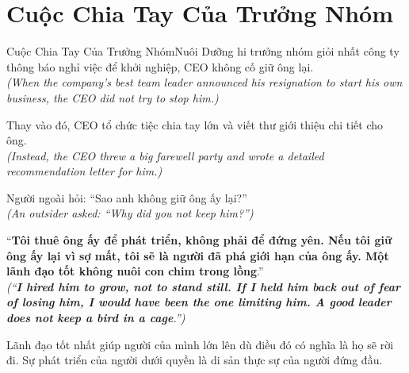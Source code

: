 \section{Cuộc Chia Tay Của Trưởng Nhóm}
\begin{truyen}{Cuộc Chia Tay Của Trưởng Nhóm}{Nuôi Dưỡng}
hi trưởng nhóm giỏi nhất công ty thông báo nghỉ việc để khởi nghiệp, CEO không cố giữ ông lại.\\
\textit{(When the company's best team leader announced his resignation to start his own business, the CEO did not try to stop him.)}

Thay vào đó, CEO tổ chức tiệc chia tay lớn và viết thư giới thiệu chi tiết cho ông.\\
\textit{(Instead, the CEO threw a big farewell party and wrote a detailed recommendation letter for him.)}

Người ngoài hỏi: ``Sao anh không giữ ông ấy lại?''\\
\textit{(An outsider asked: ``Why did you not keep him?'')}

``\textbf{Tôi thuê ông ấy để phát triển, không phải để đứng yên. Nếu tôi giữ ông ấy lại vì sợ mất, tôi sẽ là người đã phá giới hạn của ông ấy. Một lãnh đạo tốt không nuôi con chim trong lồng}.''\\
\textit{(``\textbf{I hired him to grow, not to stand still. If I held him back out of fear of losing him, I would have been the one limiting him. A good leader does not keep a bird in a cage}.'')}
\end{truyen}
\begin{baihoc}
  Lãnh đạo tốt nhất giúp người của mình lớn lên dù điều đó có nghĩa là họ sẽ rời đi. Sự phát triển của người dưới quyền là di sản thực sự của người đứng đầu.
\end{baihoc}

